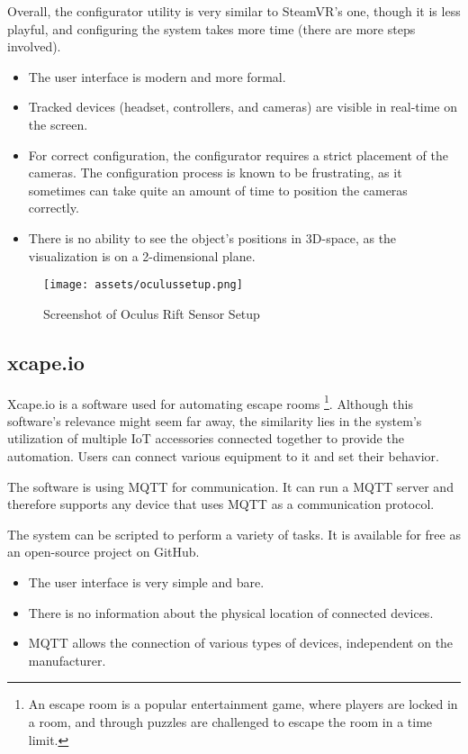 Overall, the configurator utility is very similar to SteamVR’s one, though it
is less playful, and configuring the system takes more time (there are more steps
involved).

\pagebreak

\begin{itemize}
    \itemsep0em
\item The user interface is modern and more formal.
\item Tracked devices (headset, controllers, and cameras) are visible in real-time
on the screen.
\item For correct configuration, the configurator requires a strict placement
of the cameras. The configuration process is known to be frustrating,
as it sometimes can take quite an amount of time to position the cameras correctly.
\item There is no ability to see the object’s positions in 3D-space, as the visualization is
on a 2-dimensional plane.
\end{itemize}

\begin{figure}[h]{}
\centering\texttt{[image: assets/oculussetup.png]}
\caption{Screenshot of Oculus Rift Sensor Setup}
\end{figure}

\newpage

\hypertarget{x-xcape.io}{\subsection{xcape.io}}
Xcape.io is a software used for automating escape rooms
\footnote{An escape room is a popular entertainment game, where players are locked in a room, and through puzzles are challenged to escape the room in a time limit.}.
Although this software’s relevance might seem far away,
the similarity lies in the system’s utilization of multiple IoT accessories
connected together to provide the automation. Users can connect various
equipment to it and set their behavior.

The software is using MQTT for communication. It can run a MQTT server and
therefore supports any device that uses MQTT as a communication protocol.

The system can be scripted to perform a variety of tasks. It is available
for free as an open-source project on GitHub.

\begin{itemize}
    \itemsep0em
\item The user interface is very simple and bare.
\item There is no information about the physical location of connected devices.
\item MQTT allows the connection of various types of devices, independent on the manufacturer.
\end{itemize}
